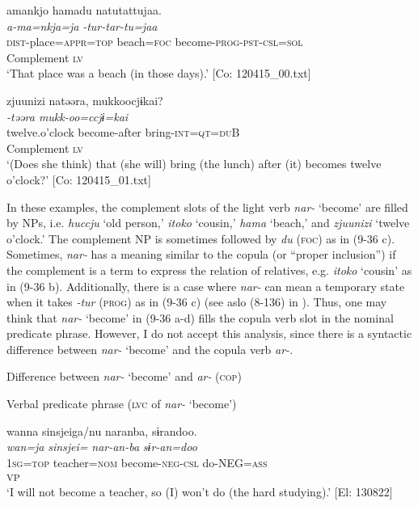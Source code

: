\ex \label{ex:9.36c} %
    \gllll  amankjo  hamadu  natutattujaa.\\
      \textit{a-ma=nkja=ja}  \textit{}  \textit{-tur-tar-tu=jaa}\\
      \textsc{dist}-place=\textsc{appr}=\textsc{top}  beach=\textsc{foc}  become-\textsc{prog}-\textsc{pst}-\textsc{csl}=\textsc{sol}\\
        Complement  \textsc{lv}\\
      \glt       ‘That place was a beach (in those days).’ [Co: 120415\_00.txt]

\ex \label{ex:9.36d} %
    \gllll  {\textbar}zjuunizi{\textbar}  natəəra,  mukkoocjɨkai?\\
      \textit{}  \textit{-təəra  mukk-oo=ccjɨ=kai}\\
      twelve.o’clock  become-after  bring-\textsc{int}=\textsc{qt}=\textsc{du}B\\
      Complement  \textsc{lv}  \\
      \glt       ‘(Does she think) that (she will) bring (the lunch) after (it) becomes twelve o’clock?’ [Co: 120415\_01.txt]
    \z
\z

In these examples, the complement slots of the light verb \textit{nar-} ‘become’ are filled by NPs, i.e. \textit{huccju} ‘old person,’ \textit{itoko} ‘cousin,’ \textit{hama} ‘beach,’ and \textit{zjuunizi} ‘twelve o’clock.’ The complement NP is sometimes followed by \textit{du} (\textsc{foc}) as in (9-36 c). Sometimes, \textit{nar-} has a meaning similar to the copula (or “proper inclusion”) \citep[114]{Payne1997} if the complement is a term to express the relation of relatives, e.g. \textit{itoko} ‘cousin’ as in (9-36 b). Additionally, there is a case where \textit{nar-} can mean a temporary state when it takes \textit{{}-tur} (\textsc{prog}) as in (9-36 c) (see aslo (8-136) in ). Thus, one may think that \textit{nar-} ‘become’ in (9-36 a-d) fills the copula verb slot in the nominal predicate phrase. However, I do not accept this analysis, since there is a syntactic difference between \textit{nar-} ‘become’ and the copula verb \textit{ar-}.

\ea   Difference between \textit{nar-} ‘become’ and \textit{ar-} (\textsc{cop}) \label{ex:9.37}

 \exi{} Verbal predicate phrase (\textsc{lvc} of \textit{nar-} ‘become’)

\ea %
 \gllll  *wanna  sinsjeiga/nu  naranba,  sɨrandoo.\\
       \textit{wan=ja}  \textit{sinsjei=}  \textit{nar-an-ba}  \textit{sɨr-an=doo}\\
       1\textsc{sg}=\textsc{top}  teacher=\textsc{nom}  become-\textsc{neg}-\textsc{csl}  do-NEG=\textsc{ass}\\
        [Complement  \textsc{lv}]\textsubscript{VP}  \\
       ‘I will not become a teacher, so (I) won’t do (the hard studying).’ [El: 130822]

